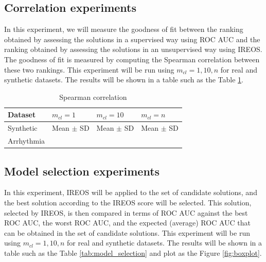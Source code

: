 \documentclass[11pt]{article}
\begin{document}
{\subsection{Correlation experiments}\label{sec:cor}
In this experiment, we will measure the goodness of fit between the ranking obtained by assessing the solutions in a supervised way using ROC AUC and the ranking obtained by assessing the solutions in an unsupervised way using IREOS. The goodness of fit is measured by computing the Spearman correlation between these two rankings. This experiment will be run using $m_{cl} = {1, 10, n}$ for real and synthetic datasets. The results will be shown in a table such as the Table \ref{tab:cor}.
\begin{table}[]
\centering
\caption{Spearman correlation}
\label{tab:cor}
\begin{tabular}{llll}
\hline
Dataset 	& $m_{cl} = 1$ & $m_{cl} = 10$ & $m_{cl} = n$  \\ \hline
Synthetic      	& Mean $\pm$ SD & Mean $\pm$ SD  &  Mean $\pm$ SD	\\
Arrhythmia     	&   &   &  	\\ \bottomrule
\end{tabular}
\end{table}

\subsection{Model selection experiments}\label{sec:model}
In this experiment, IREOS will be applied to the set of candidate solutions, and the best solution according to the IREOS score will be selected. This solution, selected by IREOS, is then compared in terms of ROC AUC against the best ROC AUC, the worst ROC AUC, and the expected (average) ROC AUC that can be obtained in the set of candidate solutions. This experiment will be run using $m_{cl} = {1, 10, n}$ for real and synthetic datasets. The results will be shown in a table such as the Table \ref{tab:model_selection} and plot as the Figure \ref{fig:boxplot}.

}
\end{document}
